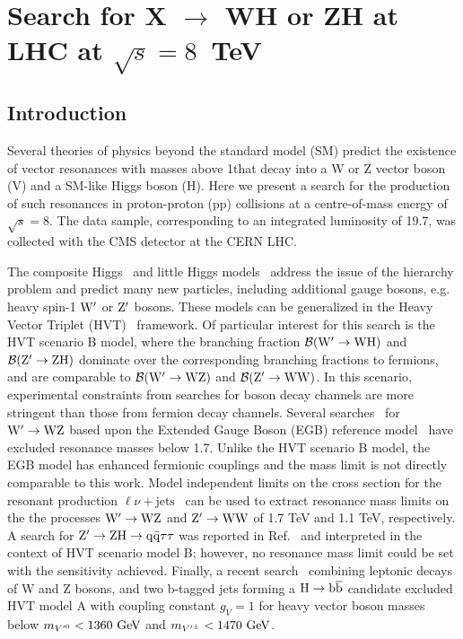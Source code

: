 \chapter{Search for X $\to$ WH or ZH at LHC at $\sqrt{s} = 8$~TeV }
\label{chap:chapter4}
\section{Introduction}
\label{sec:introduction}


Several theories of physics beyond the standard model (SM) predict the
existence of vector resonances with
masses above 1\TeVcc that decay into
a W or Z vector boson (V)
 and a SM-like Higgs boson (H).
Here we present a search for 
the production of such resonances
 in proton-proton (pp) collisions at a
centre-of-mass energy of $\sqrt{s}=8$\TeVcc.  The data sample,
corresponding to an integrated luminosity of 19.7\fbinv, was collected
with the CMS detector at the CERN LHC.



The composite Higgs~\cite{Composite0,Composite1,Composite2} and little Higgs models~\cite{Han:2003wu}
address the issue of the hierarchy problem and predict many new particles,
including additional gauge bosons, e.g. heavy spin-1 $\mathrm{W}^{\prime}$ or ${\rm Z'}$ bosons.
These models can be generalized in the Heavy Vector Triplet (HVT)~\cite{Pappadopulo:2014qza}
framework.
Of particular interest for this search is the HVT scenario B model, where
the branching fraction $\mathcal{B}({\rm W' \to WH})$ and $\mathcal{B}({\rm Z' \to ZH}) $ dominate over the corresponding 
branching fractions to fermions, and are comparable to $\mathcal{B}({\rm W' \to WZ})$ 
and $\mathcal{B}({\rm Z' \to WW})$. 
In this scenario, experimental constraints from searches for boson decay 
channels are more stringent than those from fermion decay channels. 
Several searches~\cite{Khachatryan:2014xja,
Aad:2014pha,Aad:2014xka,ATLASWWPAPER,EXO-12-024} 
for ${\rm W^\prime \rightarrow WZ}$ 
based upon the Extended Gauge Boson (EGB) reference 
model~\cite{egm} have excluded resonance 
masses below 1.7\TeVcc. Unlike the HVT scenario B model, 
the EGB model has enhanced fermionic couplings 
and the mass limit is not directly 
comparable to this work. Model independent limits on 
the cross section for the resonant 
production $\ell\nu+\mathrm{jets}$~\cite{EXO-13-009} can 
be used to extract resonance mass 
limits on the the processes ${\rm W^\prime\rightarrow WZ}$ 
and ${\rm Z^\prime \rightarrow WW}$ of 
1.7 TeV and 1.1 TeV, respectively.
A search for ${\rm Z^\prime \rightarrow ZH \rightarrow q\bar{q}}\tau\tau$
was reported in Ref.~\cite{cms-HZ-tautaujet} and
interpreted in the context of HVT scenario model B; however, 
no resonance mass limit could be set with the sensitivity achieved.
Finally, a recent search~\cite{Aad:2015yza} combining leptonic
decays of W and Z bosons, and two b-tagged jets forming a ${\rm H\to\mathrm{b\overline{b}}}$ candidate
excluded HVT model A with coupling constant $g_V = 1$ for heavy vector
boson masses below $m_{V'^0} < 1360~\mathrm{GeV}$ and $m_{V'^\pm} < 1470~\mathrm{GeV}$.

